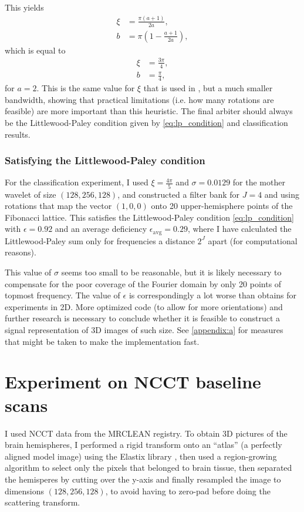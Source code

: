 \documentclass[twocolumn, openany, oneside, article]{memoir}
\begin{document}
This yields
\begin{align}
  \xi &= \frac{\pi(a + 1)}{2a},\\
  b &= \pi \left( 1 - \frac{a+1}{2a} \right),
\end{align}
which is equal to
\begin{align}
  \xi &= \frac{3\pi}{4},\\
  b &= \frac{\pi}{4},
\end{align}
for $a = 2$. This is the same value for $\xi$ that is used in
\cite{bruna2013invariant}, but a much smaller bandwidth, showing that
practical limitations (i.e. how many rotations are feasible) are more important
than this heuristic. The final arbiter should always be the Littlewood-Paley
condition given by \autoref{eq:lp_condition} and classification results.


\subsection{Satisfying the Littlewood-Paley condition}\label{subsec:lp_condition}
For the classification experiment, I used $\xi = \frac{4\pi}{5}$ and $\sigma =
0.0129$ for the mother wavelet of size $(128, 256, 128)$, and constructed a filter bank for $J = 4$ and
using rotations that map the vector $(1, 0, 0)$ onto 20 upper-hemisphere points
of the Fibonacci lattice. This satisfies the Littlewood-Paley condition
\autoref{eq:lp_condition} with $\epsilon = 0.92$ and an average deficiency
$\epsilon_{\mathrm{avg}} = 0.29$, where I have calculated the Littlewood-Paley sum
only for frequencies a distance $2^J$ apart (for computational reasons).

This value of $\sigma$ seems too small to be reasonable, but it is likely
necessary to compensate for the poor coverage of the Fourier domain by only 20
points of topmost frequency. The value of $\epsilon$ is correspondingly a lot
worse than \cite{bruna2013scattering} obtains for experiments in 2D. More
optimized code (to allow for more orientations) and further research is
necessary to conclude whether it is feasible to construct a signal
representation of 3D images of such size. See \autoref{appendix:a} for measures
that might be taken to make the implementation fast.

\chapter{Experiment on NCCT baseline scans}

I used NCCT data from the MRCLEAN registry. To obtain 3D pictures of the brain
hemispheres, I performed a rigid transform onto an \enquote{atlas} (a perfectly
aligned model image) using the Elastix library \cite{elastix}, then used a
region-growing algorithm to select only the pixels that belonged to brain
tissue, then separated the hemisperes by cutting over the y-axis and finally
resampled the image to dimensions $(128, 256, 128)$, to avoid having to zero-pad
before doing the scattering transform.
\end{document}
